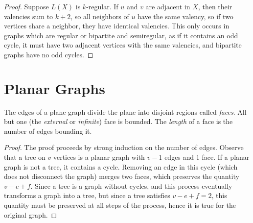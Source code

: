 
\begin{proof}
	Suppose $L(X)$ is $k$-regular.  If $u$ and $v$ are adjacent in $X$, then their valencies sum to $k+2$, so all neighbors of $u$ have the same valency, so if two vertices share a neighbor, they have identical valencies.  This only occurs in graphs which are regular or bipartite and semiregular, as if it contains an odd cycle, it must have two adjacent vertices with the same valencies, and bipartite graphs have no odd cycles.
\end{proof}


\section*{Planar Graphs}



The edges of a plane graph divide the plane into disjoint regions called \textit{faces}.  All but one (the \textit{external} or \textit{infinite}) face is bounded.  The \textit{length} of a face is the number of edges bounding it.


\begin{proof}
	
	The proof proceeds by strong induction on the number of edges. Observe that a tree on $v$ vertices is a planar graph with $v-1$ edges and $1$ face.  If a planar graph is not a tree, it contains a cycle.  Removing an edge in this cycle (which does not disconnect the graph) merges two faces, which preserves the quantity $v-e+f$.  Since a tree is a graph without cycles, and this process eventually transforms a graph into a tree, but since a tree satisfies $v-e+f=2$, this quantity must be preserved at all steps of the process, hence it is true for the original graph.
	
	
\end{proof}

